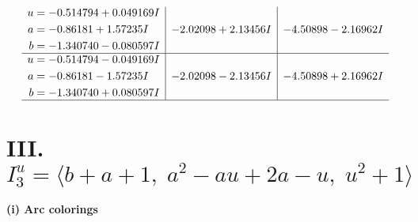 \documentclass[1p]{elsarticle_modified}
\theoremstyle{definition}
\begin{document}
$$\begin{array}{c|c|c}
\begin{aligned}
u &= -0.514794 + 0.049169 I \\
a &= -0.86181 + 1.57235 I \\
b &= -1.340740 - 0.080597 I\end{aligned}
 & -2.02098 + 2.13456 I & -4.50898 - 2.16962 I \\ \hline\begin{aligned}
u &= -0.514794 - 0.049169 I \\
a &= -0.86181 - 1.57235 I \\
b &= -1.340740 + 0.080597 I\end{aligned}
 & -2.02098 - 2.13456 I & -4.50898 + 2.16962 I\\
 \hline 
 \end{array}$$\newpage\newpage\renewcommand{\arraystretch}{1}
\centering \section*{III. $I^u_{3}= \langle b+a+1,\;a^2- a u+2 a- u,\;u^2+1 \rangle$}
\flushleft \textbf{(i) Arc colorings}\\
\end{document}
